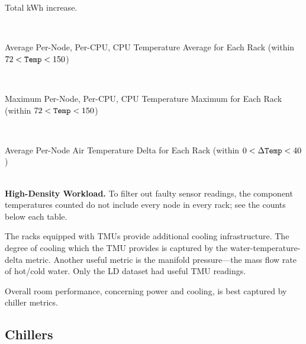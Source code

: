 \begin{table}[!h]
  \centering
   \centerline{Total kWh increase.}
   \\
   \vspace{1cm}
   \centerline{Average Per-Node, Per-CPU, CPU Temperature Average for Each Rack (within $72<{\tt Temp}<150$)}
   \\
   \vspace{1cm}
   \centerline{Maximum Per-Node, Per-CPU, CPU Temperature Maximum for Each Rack (within $72<{\tt Temp}<150$)}
   \\
   \vspace{1cm}
   \centerline{Average Per-Node Air Temperature Delta for Each Rack (within $0<\Delta{\tt Temp}<40$)}
   \\
   \caption{{\bf High-Density Workload.} To filter out faulty sensor readings, the component temperatures counted do not include every node in every rack; see the counts below each table.\label{t2}}


\end{table}



The racks equipped with TMUs provide additional cooling infrastructure.
The degree of cooling which the TMU provides is captured by the water-temperature-delta metric. Another useful metric is the manifold pressure---the mass flow rate of hot/cold water.
Only the LD dataset had useful TMU readings.


Overall room performance, concerning power and cooling, is best captured by chiller metrics.
 \subsection*{Chillers}


